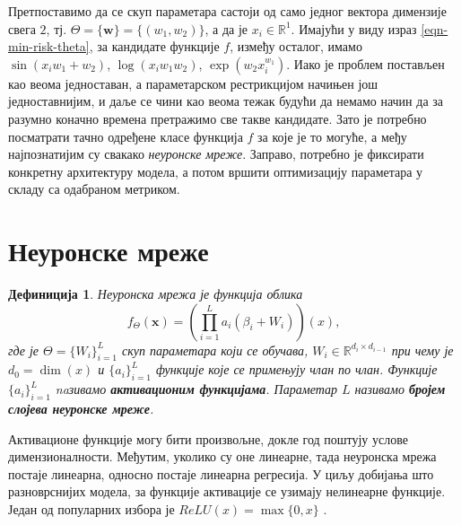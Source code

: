 \documentclass[12pt, a4paper, twoside]{book}
\numberwithin{equation}{chapter}
\numberwithin{theorem}{section}
\newtheorem{definition}{Дефиниција}
\numberwithin{definition}{section}
\numberwithin{definitionChapter}{chapter}
\begin{document}
Претпоставимо да се скуп параметара састоји од само једног вектора димензије свега $2$,
тј. $\Theta = \{\mathbf{w}\} = \{(w_1, w_2)\}$,
а да је $x_i \in \mathbb{R}^{1}$. Имајући у виду израз \ref{eqn-min-risk-theta}, за кандидате
функције $f$, између осталог, имамо $\sin(x_i w_1 + w_2)$, $\log(x_i w_1 w_2)$,
$\exp(w_2x_i^{w_1})$. Иако је проблем постављен као веома једноставан, а параметарском
рестрикцијом начињен још једноставнијим, и даље се чини као веома тежак будући да немамо
начин да за разумно коначно времена претражимо све такве кандидате. Зато је потребно посматрати
тачно одређене класе функција $f$ за које је то могуће, а међу најпознатијим су свакако
\textit{неуронске мреже}. Заправо, потребно је фиксирати конкретну архитектуру модела, а
потом вршити оптимизацију параметара у складу са одабраном метриком.

\section{Неуронске мреже}
%
%

\begin{definition}
	Неуронска мрежа је функција облика
	$$f_{\Theta}(\mathbf{x}) = \left(\prod_{i=1}^{L}a_i(\beta_i + W_i)\right) (x),$$
	где је $\Theta = \{W_i\}_{i=1}^{L}$ скуп параметара који се обучава,
	$W_i \in \mathbb{R}^{d_i \times d_{i-1}}$ при чему је $d_0 = \dim(x)$ и
	$\{a_i\}_{i=1}^{L}$ функције које се примењују члан по члан. Функције
	$\{a_i\}_{i=1}^{L}$ naзивамо \textbf{активационим функцијама}.
	Параметар $L$ називамо \textbf{бројем слојева неуронске мреже}.
\end{definition}
Активационе функције могу бити произвољне, докле год поштују услове димензионалности. Међутим,
уколико су оне линеарне, тада неуронска мрежа постаје линеарна, односно постаје линеарна регресија.
У циљу добијања што разноврснијих модела, за функције активације се узимају нелинеарне функције.
Један од популарних избора је $ReLU(x) = \max\{0, x\}$ \cite{relu}.
\end{document}
